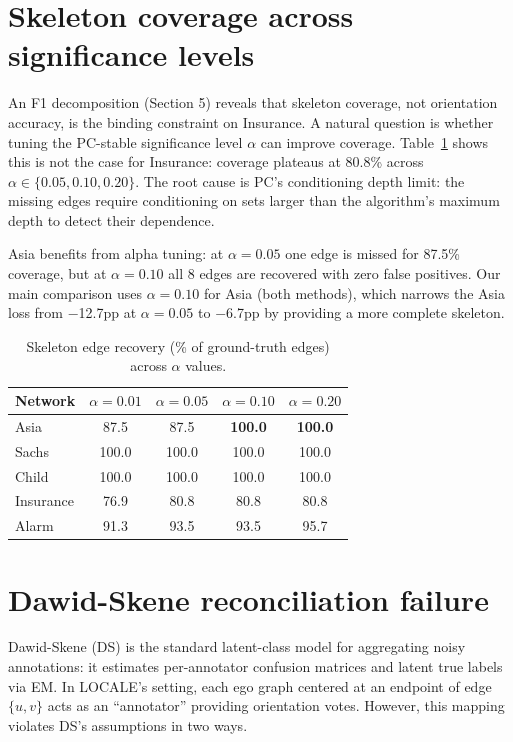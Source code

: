 \documentclass{article} %
\begin{document}
\section{Skeleton coverage across significance levels}
\label{app:alpha}

An F1 decomposition (Section 5) reveals that skeleton coverage, not orientation accuracy, is the binding constraint on Insurance. A natural question is whether tuning the PC-stable significance level $\alpha$ can improve coverage. Table~\ref{tab:alpha} shows this is not the case for Insurance: coverage plateaus at 80.8\% across $\alpha \in \{0.05, 0.10, 0.20\}$. The root cause is PC's conditioning depth limit: the missing edges require conditioning on sets larger than the algorithm's maximum depth to detect their dependence.

Asia benefits from alpha tuning: at $\alpha{=}0.05$ one edge is missed for 87.5\% coverage, but at $\alpha{=}0.10$ all 8 edges are recovered with zero false positives. Our main comparison uses $\alpha{=}0.10$ for Asia (both methods), which narrows the Asia loss from $-$12.7pp at $\alpha{=}0.05$ to $-$6.7pp by providing a more complete skeleton.

\begin{table}[h]
\centering
\caption{Skeleton edge recovery (\% of ground-truth edges) across $\alpha$ values.}
\small
\begin{tabular}{lcccc}
\toprule
Network & $\alpha{=}0.01$ & $\alpha{=}0.05$ & $\alpha{=}0.10$ & $\alpha{=}0.20$ \\
\midrule
Asia      & 87.5 & 87.5 & \textbf{100.0} & \textbf{100.0} \\
Sachs     & 100.0 & 100.0 & 100.0 & 100.0 \\
Child     & 100.0 & 100.0 & 100.0 & 100.0 \\
Insurance & 76.9 & 80.8 & 80.8 & 80.8 \\
Alarm     & 91.3 & 93.5 & 93.5 & 95.7 \\
\bottomrule
\end{tabular}
\label{tab:alpha}
\end{table}


\section{Dawid-Skene reconciliation failure}
\label{app:ds}

Dawid-Skene (DS) is the standard latent-class model for aggregating noisy annotations: it estimates per-annotator confusion matrices and latent true labels via EM. In LOCALE's setting, each ego graph centered at an endpoint of edge $\{u,v\}$ acts as an ``annotator'' providing orientation votes. However, this mapping violates DS's assumptions in two ways.
\end{document}
